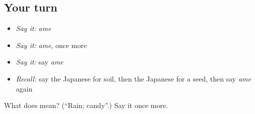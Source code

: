 \subsection*{Your turn}
\begin{itemize}
\raggedright
  \item \emph{Say it:} \emph{ame}
  \item \emph{Say it:} \emph{ame}, once more
  \item \emph{Say it:} say \emph{ame}
  \item \emph{Recall:} say the Japanese for soil, then the Japanese for a seed, then say \emph{ame} again
\end{itemize}

\begin{tcolorbox}[breakable,colback=teal!4,colframe=teal!35!black,title={Before you move on}]
What does  mean? (\textquotedblleft{}Rain; candy\textquotedblright{}.) Say it once more.
\end{tcolorbox}
